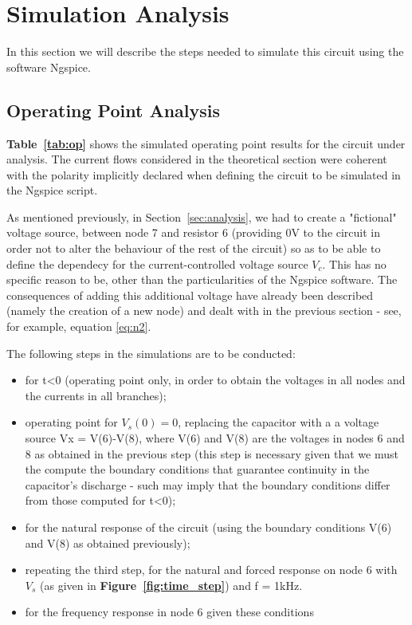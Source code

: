\section{Simulation Analysis}
\label{sec:simulation}
In this section we will describe the steps needed to simulate this circuit using the software Ngspice.
\subsection{Operating Point Analysis}
\textbf{Table~\ref{tab:op}} shows the simulated operating point results for the circuit
under analysis. The current flows considered in the theoretical section were coherent with the polarity implicitly declared when defining the circuit to be simulated in the Ngspice script.\par
As mentioned previously, in Section~\ref{sec:analysis}, we had to create a "fictional" voltage source, between node 7 and resistor 6 (providing 0V to the circuit in order not to alter the behaviour of the rest of the circuit) so as to be able to define the dependecy for the current-controlled voltage source {\it $V_c$}. This has no specific reason to be, other than the particularities of the Ngspice software. The consequences of adding this additional voltage have already been described (namely the creation of a new node) and dealt with in the previous section - see, for example, equation \ref{eq:n2}.\par
The following steps in the simulations are to be conducted: 
\begin{itemize}
	\item for t<0 (operating point only, in order to obtain the voltages in all nodes and the currents in all branches);
	\item operating point for {\it $V_s(0) = 0$}, replacing the capacitor with a a voltage source Vx = V(6)-V(8), where V(6) and V(8) are the voltages in nodes 6 and 8 as obtained in the previous step (this step is necessary given that we must the compute the boundary conditions that guarantee continuity in the capacitor's discharge - such may imply that the boundary conditions differ from those computed for t<0);
	\item for the natural response of the circuit (using the boundary conditions V(6) and V(8) as obtained previously);
	\item repeating the third step, for the natural and forced response on node 6 with {\it $V_s$} (as given in \textbf{Figure~\ref{fig:time_step}}) and f = 1kHz.
	\item for the frequency response in node 6 given these conditions
\end{itemize}

